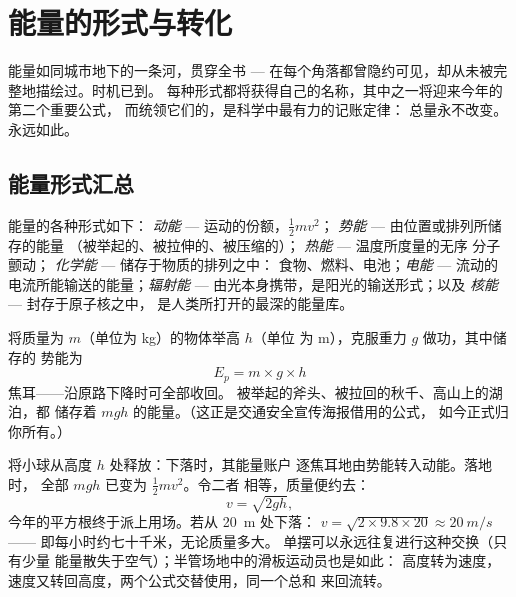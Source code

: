 \chapter{能量的形式与转化}\label{ch:g9:energy-conversions}

能量如同城市地下的一条河，贯穿全书 ---
在每个角落都曾隐约可见，却从未被完整地描绘过。时机已到。
每种形式都将获得自己的名称，其中之一将迎来今年的第二个重要公式，
而统领它们的，是科学中最有力的记账定律：
总量永不改变。永远如此。

\section{能量形式汇总}

\begin{definition}[能量的形式]\label{def:g9:energy-conversions:forms}
能量的各种形式如下：
\emph{动能} --- 运动的份额，$\frac12 m v^2$；
\emph{势能} --- 由位置或排列所储存的能量
（被举起的、被拉伸的、被压缩的）；
\emph{热能} --- 温度所度量的无序
分子颤动；
\emph{化学能} --- 储存于物质的排列之中：
食物、燃料、电池；\emph{电能} --- 流动的
电流所能输送的能量；\emph{辐射能} ---
由光本身携带，是阳光的输送形式；以及
\emph{核能} --- 封存于原子核之中，
是人类所打开的最深的能量库。
\end{definition}

\begin{proposition}[重力势能]\label{prop:g9:energy-conversions:ep}
将质量为 $m$（单位为 \unit{kg}）的物体举高 $h$（单位
为 \unit{m}），克服重力 $g$ 做功，其中储存的
势能为
\[
E_p = m \times g \times h
\]
焦耳——沿原路下降时可全部收回。
被举起的斧头、被拉回的秋千、高山上的湖泊，都
储存着 $m g h$ 的能量。（这正是交通安全宣传海报借用的公式，
如今正式归你所有。）
\end{proposition}

\begin{example}[能量的大交易：$E_p$ 与 $E_k$]\label{ex:g9:energy-conversions:trade}
将小球从高度 $h$ 处释放：下落时，其能量账户
逐焦耳地由势能转入动能。落地时，
全部 $m g h$ 已变为 $\frac12 m v^2$。令二者
相等，质量便约去：
\[
v = \sqrt{2 g h},
\]
今年的平方根终于派上用场。若从 \qty{20}{m} 处下落：
$v = \sqrt{2 \times 9.8 \times 20} \approx \qty{20}{m/s}$ ——
即每小时约七十千米，无论质量多大。
单摆可以永远往复进行这种交换（只有少量
能量散失于空气）；半管场地中的滑板运动员也是如此：
高度转为速度，速度又转回高度，两个公式交替使用，同一个总和
来回流转。
\end{example}

